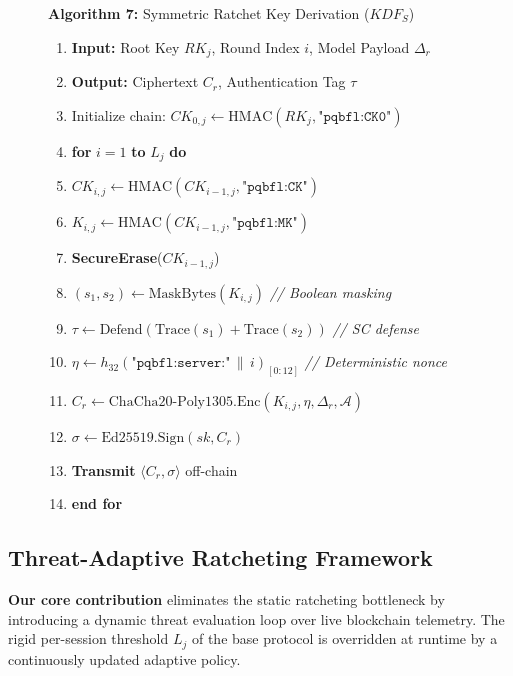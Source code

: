 \documentclass[journal, 10pt, twocolumn]{IEEEtran}
\begin{document}
\begin{figure}[!t]
\hrulefill
\vspace{-0.2cm}
\begin{center}
\textbf{Algorithm 7:} Symmetric Ratchet Key Derivation ($KDF_S$)
\end{center}
\vspace{-0.2cm}
\hrulefill
\begin{enumerate}
    \item \textbf{Input:} Root Key $RK_j$, Round Index $i$, Model Payload $\Delta_r$
    \item \textbf{Output:} Ciphertext $C_r$, Authentication Tag $\tau$
    \item Initialize chain: $CK_{0,j} \leftarrow \text{HMAC}(RK_j, \texttt{"pqbfl:CK0"})$
    \item \textbf{for} $i = 1$ \textbf{to} $L_j$ \textbf{do}
    \item \quad $CK_{i,j} \leftarrow \text{HMAC}(CK_{i-1,j}, \texttt{"pqbfl:CK"})$
    \item \quad $K_{i,j} \leftarrow \text{HMAC}(CK_{i-1,j}, \texttt{"pqbfl:MK"})$
    \item \quad \textbf{SecureErase}($CK_{i-1,j}$)
    \item \quad $(s_1, s_2) \leftarrow \text{MaskBytes}(K_{i,j})$ \quad \textit{// Boolean masking}
    \item \quad $\tau \leftarrow \text{Defend}(\text{Trace}(s_1) + \text{Trace}(s_2))$ \quad \textit{// SC defense}
    \item \quad $\eta \leftarrow h_{32}(\texttt{"pqbfl:server:"} \,\|\, i)_{[0:12]}$ \quad \textit{// Deterministic nonce}
    \item \quad $C_r \leftarrow \text{ChaCha20-Poly1305.Enc}(K_{i,j}, \eta, \Delta_r, \mathcal{A})$
    \item \quad $\sigma \leftarrow \text{Ed25519.Sign}(sk, C_r)$
    \item \quad \textbf{Transmit} $\langle C_r, \sigma \rangle$ off-chain
    \item \textbf{end for}
\end{enumerate}
\hrulefill
\end{figure}
\newpage

\subsection{Threat-Adaptive Ratcheting Framework}
\label{sec:contribution_adaptive}

\textbf{Our core contribution} eliminates the static ratcheting bottleneck by introducing a dynamic threat evaluation loop over live blockchain telemetry. The rigid per-session threshold $L_j$ of the base protocol is overridden at runtime by a continuously updated adaptive policy.
\end{document}
